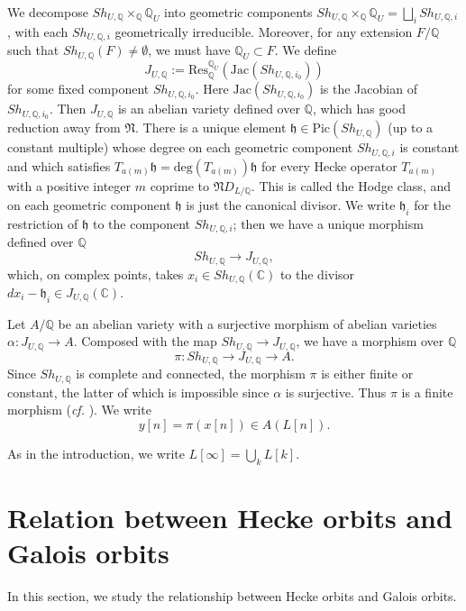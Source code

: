 \documentclass[11pt,oneside,reqno]{amsart}
\newcommand{\degrm}{\mathrm{deg}}
\newcommand{\Res}{\mathrm{Res}}
\newcommand{\C}{\mathbb{C}}
\newcommand{\Q}{\mathbb{Q}}
\newcommand{\hfrak}{\mathfrak{h}}
\newcommand{\Nfrak}{\mathfrak{N}}
\theoremstyle{plain}
\begin{document}
	
	We decompose $Sh_{U,\Q}\times_\Q\Q_U$ into geometric components $Sh_{U,\Q}\times_\Q\Q_U=\bigsqcup_{i} Sh_{U,\Q,i}$, with each $Sh_{U,\Q,i}$ geometrically irreducible. Moreover, for any extension $F/\Q$ such that $Sh_{U,\Q}(F)\neq\emptyset$, we must have $\Q_U\subset F$. We define
	\[
	J_{U,\Q}:=\Res^{\Q_U}_\Q(\mathrm{Jac}( Sh_{U,\Q,i_0}))
	\]
	for some fixed component $ Sh_{U,\Q,i_0}$. Here $\mathrm{Jac}(Sh_{U,\Q,i_0})$ is the Jacobian of $Sh_{U,\Q,i_0}$. Then $J_{U,\Q}$ is an abelian variety defined over $\Q$, which has good reduction away from $\Nfrak$. There is a unique element $\hfrak\in\mathrm{Pic}(Sh_{U,\Q})$ (up to a constant multiple) whose degree on each geometric component $Sh_{U,\Q,i}$ is constant and which satisfies $T_{a(m)}\hfrak=\degrm(T_{a(m)})\hfrak$ for every Hecke operator $T_{a(m)}$ with a positive integer $m$ coprime to $\Nfrak D_{L/\Q}$. This is called the Hodge class, and on each geometric component $\hfrak$ is just the canonical divisor. We write $\hfrak_i$ for the restriction of $\hfrak$ to the component $Sh_{U,\Q,i}$; then we have a unique morphism defined over $\Q$
	\[
	Sh_{U,\Q}\to J_{U,\Q},
	\]
	which, on complex points, takes $x_i\in  Sh_{U,\Q}(\C)$ to the divisor $dx_i-\hfrak_i\in J_{U,\Q}(\C)$.
	
	
	Let $A/\Q$ be an abelian variety with a surjective morphism of abelian varieties $\alpha\colon J_{U,\Q}\to A$. Composed with the map $ Sh_{U,\Q}\to J_{U,\Q}$, we have a morphism over $\Q$
	\[
	\pi\colon Sh_{U,\Q}\to J_{U,\Q}\to A.
	\]
	Since $ Sh_{U,\Q}$ is complete and connected, the morphism $\pi$ is either finite or constant, the latter of which is impossible since $\alpha$ is surjective. Thus $\pi$ is a finite morphism (\emph{cf.} \cite[Lemma 3.9]{CornutVatsal2007}). We write
	\[
	y[n]=\pi(x[n])
	\in
	A(L[n]).
	\]
	
	
	
	As in the introduction, we write $L[\infty]=\bigcup_kL[k]$. 
	
	
	
	
	
	
	
	
	
	
	
	
	
	
	
	
	\section{Relation between Hecke orbits and Galois orbits}\label{Hecke orbit and Galois orbit}
	In this section, we study the relationship between Hecke orbits and Galois orbits.
	
\end{document}
